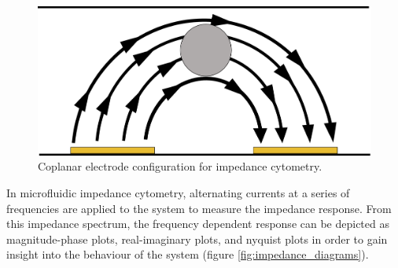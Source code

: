  
 \begin{figure}[ht]
     \centering
     \includegraphics[width=\textwidth]{images/coplanar.png}
     \caption{Coplanar electrode configuration for impedance cytometry.}
     \label{fig:coplanar_electrodes}
 \end{figure}
 
 \par In microfluidic impedance cytometry, alternating currents at a series of frequencies are applied to the system to measure the impedance response. From this impedance spectrum, the frequency dependent response can be depicted as magnitude-phase plots, real-imaginary plots, and nyquist plots in order to gain insight into the behaviour of the system (figure \ref{fig:impedance_diagrams}). 
 

